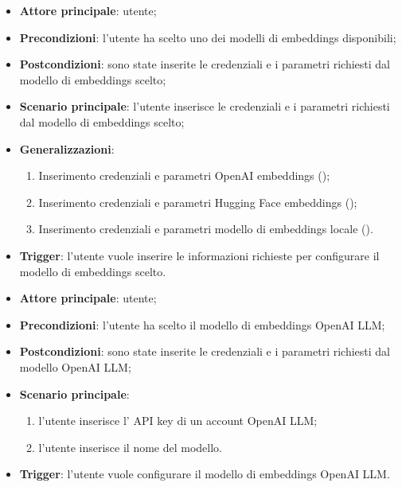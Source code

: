 \documentclass[10pt, a4paper]{article}
\begin{document}
    \begin{itemize}
        \item \textbf{Attore principale}: utente;
        \item \textbf{Precondizioni}: l’utente ha scelto uno dei modelli di embeddings disponibili;
        \item \textbf{Postcondizioni}: sono state inserite le credenziali e i parametri richiesti dal modello di embeddings scelto;
        \item \textbf{Scenario principale}: l’utente inserisce le credenziali e i parametri richiesti dal modello di embeddings scelto;
        \item \textbf{Generalizzazioni}:
            \begin{enumerate}
                \item Inserimento credenziali e parametri OpenAI embeddings  ();
                \item Inserimento credenziali e parametri Hugging Face embeddings ();
                \item Inserimento credenziali e parametri modello di embeddings locale ().
            \end{enumerate}
        \item \textbf{Trigger}: l’utente vuole inserire le informazioni richieste per configurare il modello di embeddings scelto.
    \end{itemize}

    \begin{itemize}
        \item \textbf{Attore principale}: utente;
        \item \textbf{Precondizioni}: l’utente ha scelto il modello di embeddings OpenAI LLM;
        \item \textbf{Postcondizioni}: sono state inserite le credenziali e i parametri richiesti dal modello OpenAI LLM;
        \item \textbf{Scenario principale}:
            \begin{enumerate}
                \item l’utente inserisce l’ API key di un account OpenAI LLM;
                \item l’utente inserisce il nome del modello.
            \end{enumerate}
        \item \textbf{Trigger}: l’utente vuole configurare il modello di embeddings OpenAI LLM.
    \end{itemize}
\end{document}
